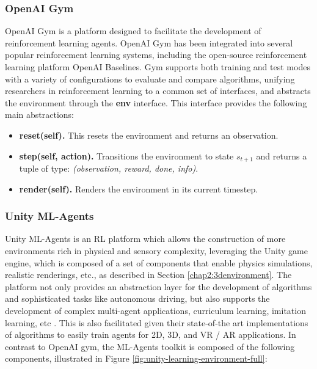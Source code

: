 \subsubsection{OpenAI Gym}
OpenAI Gym \cite{github-unity-mlagents-toolkit} is a platform designed to facilitate the development of reinforcement learning agents. OpenAI Gym has been integrated into several popular reinforcement learning systems, including the open-source reinforcement learning platform OpenAI Baselines. Gym supports both training and test modes with a variety of configurations to evaluate and compare algorithms, unifying researchers in reinforcement learning to a common set of interfaces, and abstracts the environment through the \textbf{env} interface. This interface provides the following main abstractions:
\begin{itemize}
    \item \textbf{reset(self).} This resets the environment and returns an observation.
    \item \textbf{step(self, action).} Transitions the environment to state $s_{t+1}$ and returns a tuple of type: \textit{(observation, reward, done, info)}.
    \item \textbf{render(self).} Renders the environment in its current timestep.
\end{itemize}

\subsubsection{Unity ML-Agents}
Unity ML-Agents \cite{github-unity-mlagents-toolkit} is an RL platform which allows the construction of more environments rich in physical and sensory complexity, leveraging the Unity game engine, which is composed of a set of components that enable physics simulations, realistic renderings, etc., as described in Section \ref{chap2:3denvironment}. The platform not only 
provides an abstraction layer for the development of algorithms and sophisticated tasks like autonomous driving, but also supports the development of complex multi-agent applications, curriculum learning, imitation learning, etc \cite{github-unity-mlagents-toolkit}. This is also facilitated given their state-of-the art implementations of algorithms to easily train agents for 2D, 3D, and VR / AR applications. In contrast to OpenAI gym, the ML-Agents toolkit is composed of the following components, illustrated in Figure \ref{fig:unity-learning-environment-full}:

